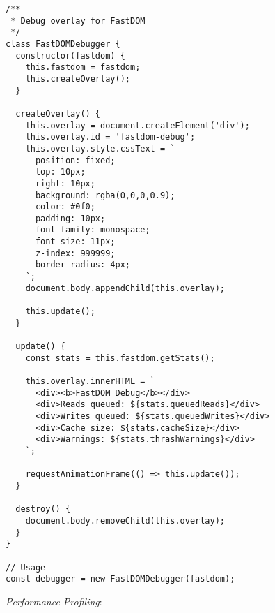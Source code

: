 \documentclass[11pt]{article}
\begin{document}
\begin{verbatim}
/**
 * Debug overlay for FastDOM
 */
class FastDOMDebugger {
  constructor(fastdom) {
    this.fastdom = fastdom;
    this.createOverlay();
  }
  
  createOverlay() {
    this.overlay = document.createElement('div');
    this.overlay.id = 'fastdom-debug';
    this.overlay.style.cssText = `
      position: fixed;
      top: 10px;
      right: 10px;
      background: rgba(0,0,0,0.9);
      color: #0f0;
      padding: 10px;
      font-family: monospace;
      font-size: 11px;
      z-index: 999999;
      border-radius: 4px;
    `;
    document.body.appendChild(this.overlay);
    
    this.update();
  }
  
  update() {
    const stats = this.fastdom.getStats();
    
    this.overlay.innerHTML = `
      <div><b>FastDOM Debug</b></div>
      <div>Reads queued: ${stats.queuedReads}</div>
      <div>Writes queued: ${stats.queuedWrites}</div>
      <div>Cache size: ${stats.cacheSize}</div>
      <div>Warnings: ${stats.thrashWarnings}</div>
    `;
    
    requestAnimationFrame(() => this.update());
  }
  
  destroy() {
    document.body.removeChild(this.overlay);
  }
}

// Usage
const debugger = new FastDOMDebugger(fastdom);
\end{verbatim}

\emph{Performance Profiling}:
\end{document}
